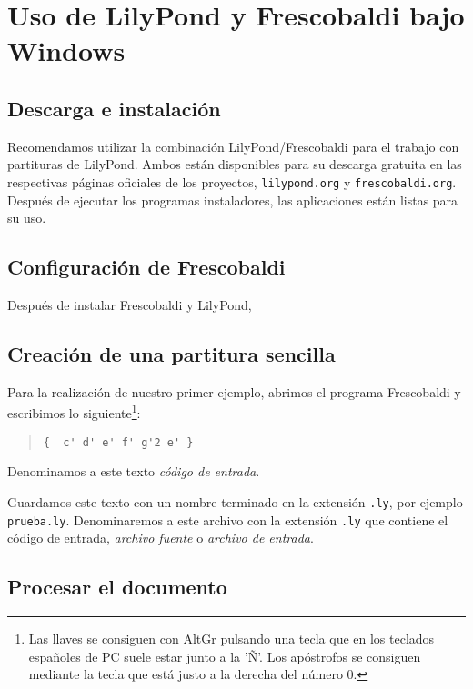 \section{Uso de LilyPond y Frescobaldi bajo Windows}
\subsection{Descarga e instalación}

Recomendamos utilizar la combinación LilyPond/Frescobaldi para el
trabajo con partituras de LilyPond. Ambos están disponibles para su
descarga gratuita en las respectivas páginas oficiales de los
proyectos, \texttt{lilypond.org} y \texttt{frescobaldi.org}.  Después
de ejecutar los programas instaladores, las aplicaciones están listas
para su uso.

\subsection{Configuración de Frescobaldi}
Después de instalar Frescobaldi y LilyPond, 

\subsection{Creación de una partitura sencilla}

Para la realización de nuestro primer ejemplo, abrimos el programa
Frescobaldi y escribimos lo siguiente\footnote{Las llaves se consiguen
  con AltGr pulsando una tecla que en los teclados españoles de PC
  suele estar junto a la 'Ñ'. Los apóstrofos se consiguen mediante la
  tecla que está justo a la derecha del número 0.}:

\begin{quote}
\begin{verbatim}
{  c' d' e' f' g'2 e' }
\end{verbatim}
\end{quote}

Denominamos a este texto \emph{código de entrada}.

Guardamos este texto con un nombre terminado en la extensión
\verb+.ly+, por ejemplo \verb+prueba.ly+.  Denominaremos a este
archivo con la extensión \verb+.ly+ que contiene el código de entrada,
\emph{archivo fuente} o \emph{archivo de entrada}.

\subsection{Procesar el documento}

